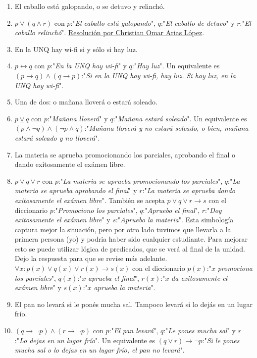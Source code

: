 \documentclass[a4paper]{article}
\newcommand{\answer}{\item[**]}
\newcommand{\then}{\to}
\newcommand{\eq}{\leftrightarrow}
\newcommand{\xor}{\veebar}
\begin{document}
\begin{enumerate}
\begin{multicols}{2}
\begin{enumerate} [label=(\alph*)]
		\item El caballo está galopando, o se detuvo y relinchó.
		\answer $p \lor (q \land r)$ con $p$:"\textit{El caballo está galopando}", $q$:"\textit{El caballo de detuvo}" y $r$:"\textit{El caballo relinchó}". \href{https://youtu.be/TgwraosKUuY?t=70}{Resolución por Christian Omar Arias López}.

		\item En la UNQ hay wi-fi si y sólo si hay luz.
		\answer $p\eq q$ con $p$:"\textit{En la UNQ hay wi-fi}" y $q$:"\textit{Hay luz}". Un equivalente es $(p \then q) \land (q \then p)$:"\textit{Si en la UNQ hay wi-fi, hay luz. Si hay luz, en la UNQ hay wi-fi}".

		\item Una de dos: o mañana lloverá o estará soleado. 
		\answer $p \xor q$ con $p$:"\textit{Mañana lloverá}" y $q$:"\textit{Mañana estará soleado}". Un equivalente es $(p \land \neg q) \land (\neg p \land q)$:"\textit{Mañana lloverá y no estará soleado, o bien, mañana estará soleado y no lloverá}". 

		\item La materia se aprueba promocionando los parciales, aprobando el final o dando exitosamente el exámen libre. 
		\answer $p \lor q \lor r$ con $p$:"\textit{La materia se aprueba promocionando los parciales}", $q$:"\textit{La materia se aprueba aprobando el final}" y $r$:"\textit{La materia se aprueba dando exitosamente el exámen libre}". También se acepta $p \lor q \lor r \then s$ con el diccionario $p$:"\textit{Promociono los parciales}", $q$:"\textit{Apruebo el final}", $r$:"\textit{Doy exitosamente el exámen libre}" y $s$:"\textit{Apruebo la materia}". Esta simbología captura mejor la situación, pero por otro lado tuvimos que llevarla a la primera persona (yo) y podria haber sido cualquier estudiante. Para mejorar esto se puede utilizar lógica de predicados, que se verá al final de la unidad. Dejo la respuesta para que se revise más adelante. $\forall x: p(x) \lor q(x) \lor r(x) \then s(x)$ con el diccionario $p(x)$:"$x$ \textit{promociona los parciales}", $q(x)$:"$x$ \textit{aprueba el final}", $r(x)$:"$x$ \textit{da exitosamente el exámen libre}" y $s(x)$:"$x$ \textit{aprueba la materia}".

		\item El pan no levará si le ponés mucha sal. Tampoco levará si lo dejás en un lugar frío. 
		\answer $(q\then \neg p)  \land  (r\then \neg p)$ con $p$:"\textit{El pan levará}", $q$:"\textit{Le pones mucha sal}" y $r$:"\textit{Lo dejas en un lugar frío}". Un equivalente es $(q \lor r) \then \neg p$:"\textit{Si le pones mucha sal o lo dejas en un lugar frío, el pan no levará}".


\end{enumerate}
\end{multicols}
\end{enumerate}
\end{document}
